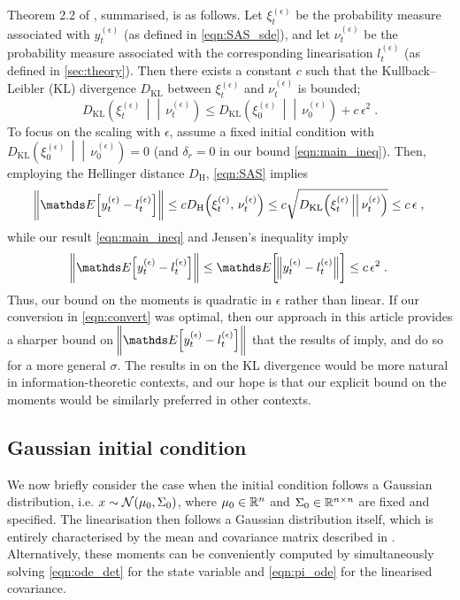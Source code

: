 Theorem 2.2 of \citet{Sanz-AlonsoStuart_2017_GaussianApproximationsSmall}, summarised, is as follows.
Let \(\xi_t^{(\epsilon)}\) be the probability measure associated with \(y_t^{(\epsilon)}\) (as defined in \cref{eqn:SAS_sde}), and let \(\nu_t^{(\epsilon)}\) be the probability measure associated with the corresponding linearisation \(l_t^{(\epsilon)}\) (as defined in \cref{sec:theory}).
Then there exists a constant \(c\) such that the Kullback--Leibler (KL) divergence \(D_{\mathrm{KL}}\) between \(\xi_t^{(\epsilon)}\) and \(\nu_t^{(\epsilon)}\) is bounded;
\begin{equation}
	\label{eqn:SAS}
	D_{\mathrm{KL}}\!\left(\xi_t^{(\epsilon)} \,\middle|\middle|\, \nu_t^{(\epsilon)}\right) \le D_{\mathrm{KL}}\!\left(\xi_0^{(\epsilon)} \,\middle|\middle|\, \nu_0^{(\epsilon)}\right) + c \, \epsilon^2\;.
\end{equation}
To focus on the scaling with \(\epsilon\), assume a fixed initial condition with \(D_{\mathrm{KL}}\!\left(\xi_0^{(\epsilon)} \,\middle|\middle|\, \nu_0^{(\epsilon)}\right) = 0\) (and \(\delta_r = 0\) in our bound \cref{eqn:main_ineq}). Then, employing the Hellinger distance \(D_{\mathrm{H}}\), \cref{eqn:SAS} implies
\begin{align}
	\label{eqn:convert}
	\norm{\avg{ y_t^{(\epsilon)} - l_t^{(\epsilon)}} } \le c D_{\mathrm{H}}\!\left(\xi_t^{(\epsilon)} ,\, \nu_t^{(\epsilon)}\right) \le c \sqrt{D_{\mathrm{KL}}\!\left(\xi_t^{(\epsilon)} \,\middle|\middle|\, \nu_t^{(\epsilon)}\right)} \le c \, \epsilon \;,
\end{align}
while our result \cref{eqn:main_ineq} and Jensen's inequality imply
\[
	\norm{\avg{ y_t^{(\epsilon)} - l_t^{(\epsilon)}} } \le \avg{\norm{y_t^{(\epsilon)} - l_t^{(\epsilon)}}} \leq c \, \epsilon^2\;.
\]
Thus, our bound on the moments is quadratic in \( \epsilon \) rather than linear.
If our conversion in \cref{eqn:convert} was optimal, then our approach in this article
provides a sharper bound on \(\norm{\avg{y_t^{(\epsilon)} - l_t^{(\epsilon)}}}\) that the
results of  \citet{Sanz-AlonsoStuart_2017_GaussianApproximationsSmall} imply, and do so for a
more general $ \sigma $.
The results in  \citet{Sanz-AlonsoStuart_2017_GaussianApproximationsSmall} on the KL divergence would be more natural in information-theoretic contexts, and our hope is that our explicit bound on the moments would be similarly preferred in other contexts.




\subsection{Gaussian initial condition}\label{sec:theory_gauss}
We now briefly consider the case when the initial condition follows a Gaussian distribution, i.e. \(x \sim\mathcal{N}\!\left(\mu_0, \Sigma_0\right)\), where \(\mu_0 \in \mathbb{R}^n\) and \(\Sigma_0 \in \mathbb{R}^{n \times n}\) are fixed and specified.
The linearisation then follows a Gaussian distribution itself, which is entirely characterised by the mean and covariance matrix described in .
Alternatively, these moments can be conveniently computed by simultaneously solving \cref{eqn:ode_det} for the state variable and \cref{eqn:pi_ode} for the linearised covariance.

